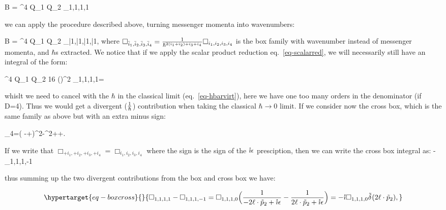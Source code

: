 \documentclass[
  10pt,
  a4paper,
  DIV=11,
  numbers=noendperiod,
  twoside]{scrreprt}
\let\[\relax \let\]\relax %
\DeclareRobustCommand{\[}{\begin{equation}}
\DeclareRobustCommand{\]}{\end{equation}}
\begin{document}
\[
\im B = \elch^4 Q_{1} Q_{2} \int \dn[D]{\ell} \Box_{1,1,1,1}
\]

we can apply the procedure described above, turning messenger momenta
into wavenumbers:

\[
\im B = \elch^4 Q_{1} Q_{2} \int \dn[D]{\bar{\ell}} \Box_{\bar{1},\bar{1},\bar{1},\bar{1}},
\] where
\(\Box_{\bar{i}_1,\bar{i}_2,\bar{i}_3,\bar{i}_4} =\frac{1}{\hbar^{2(i_1+i_2)+i_3+i_4}} \Box_{i_1,i_2,i_3,i_4}\)
is the box family with wavenumber instead of messenger momenta, and
\(\hbar\)s extracted. We notice that if we apply the scalar product
reduction eq.~\ref{eq-scalarred}, we will necessarily still have an
integral of the form:

\[
\elch^4 Q_{1} Q_{2} 16 (\semom[1]\cdot \semom[2])^2 \int \dn[D]{{\ell}}\Box_{1,1,1,1}=\order[D-6]{\hbar}
\]

whislt we need to cancel with the \(\hbar\) in the classical limit
(eq.~\ref{eq-hbarvirt}), here we have one too many orders in the
denominator (if D=4). Thus we would get a divergent (\(\frac{1}{\hbar}\))
contribution when taking the classical \(\hbar\to 0\) limit. If we
consider now the cross box, which is the same family as above but with
an extra minus sign:

\[
\tilde{\rho}_4=( \Half[q] -\ell+\semom[2])^2-\mass[2]^2+\im \epsilon{}\ell\cdot\semom[2]+\im \epsilon.
\]

If we write that \(\Box_{+i_1,+i_2,+i_3,+i_4}=\Box_{i_1,i_2,i_3,i_4}\)
where the sign is the sign of the \(\mathring{\imath}\epsilon\) presciption, then we
can write the cross box integral as: \[
\int \dn[D]{\ell} -\Box_{1,1,1,-1}
\]

thus summing up the two divergent contributions from the box and cross
box we have:

\begin{equation}\protect\hypertarget{eq-boxcross}{}{
\Box_{1,1,1,1}-\Box_{1,1,1,-1}=\Box_{1,1,1,0}\pa[\Big]{\inv{-2\ell\cdot\semom[2]+\im \epsilon}-\inv{    2\ell\cdot\semom[2]+\im \epsilon}}=-\im\Box_{1,1,1,0}\ndeltafn{2\ell\cdot\semom[2]},
}\label{eq-boxcross}\end{equation}
\end{document}
